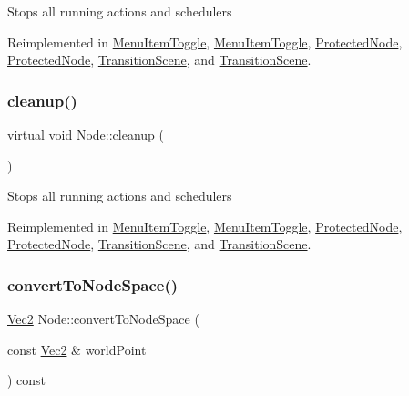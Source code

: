 Stops all running actions and schedulers 

Reimplemented in \hyperlink{classMenuItemToggle_a4e70a16bd34c5e770e55e5bf1591aa62}{Menu\+Item\+Toggle}, \hyperlink{classMenuItemToggle_a07c137c20a38647fe07e948fa14fbe42}{Menu\+Item\+Toggle}, \hyperlink{classProtectedNode_a6eda3b644eb5be15fe5c717c48d25634}{Protected\+Node}, \hyperlink{classProtectedNode_a5462a6202b458193c1881bcdcc5be78d}{Protected\+Node}, \hyperlink{classTransitionScene_aac61fc66f0b5447ba999cbfda5d0a926}{Transition\+Scene}, and \hyperlink{classTransitionScene_a1295b348d0960d857f27a39ecfb52869}{Transition\+Scene}.

\mbox{\label{classNode_a4f07dff5b7089859092bece5f328aa5d}} 
\subsubsection{\texorpdfstring{cleanup()}{cleanup()}\hspace{0.1cm}{\footnotesize\ttfamily [2/2]}}
{\footnotesize\ttfamily virtual void Node\+::cleanup (\begin{DoxyParamCaption}{ }\end{DoxyParamCaption})\hspace{0.3cm}{\ttfamily [virtual]}}

Stops all running actions and schedulers 

Reimplemented in \hyperlink{classMenuItemToggle_a4e70a16bd34c5e770e55e5bf1591aa62}{Menu\+Item\+Toggle}, \hyperlink{classMenuItemToggle_a07c137c20a38647fe07e948fa14fbe42}{Menu\+Item\+Toggle}, \hyperlink{classProtectedNode_a6eda3b644eb5be15fe5c717c48d25634}{Protected\+Node}, \hyperlink{classProtectedNode_a5462a6202b458193c1881bcdcc5be78d}{Protected\+Node}, \hyperlink{classTransitionScene_aac61fc66f0b5447ba999cbfda5d0a926}{Transition\+Scene}, and \hyperlink{classTransitionScene_a1295b348d0960d857f27a39ecfb52869}{Transition\+Scene}.

\mbox{\label{classNode_ae7bffc192b6e9b24871108d472a0e85a}} 
\subsubsection{\texorpdfstring{convert\+To\+Node\+Space()}{convertToNodeSpace()}\hspace{0.1cm}{\footnotesize\ttfamily [1/2]}}
{\footnotesize\ttfamily \hyperlink{classVec2}{Vec2} Node\+::convert\+To\+Node\+Space (\begin{DoxyParamCaption}\item[{const \hyperlink{classVec2}{Vec2} \&}]{world\+Point }\end{DoxyParamCaption}) const}

